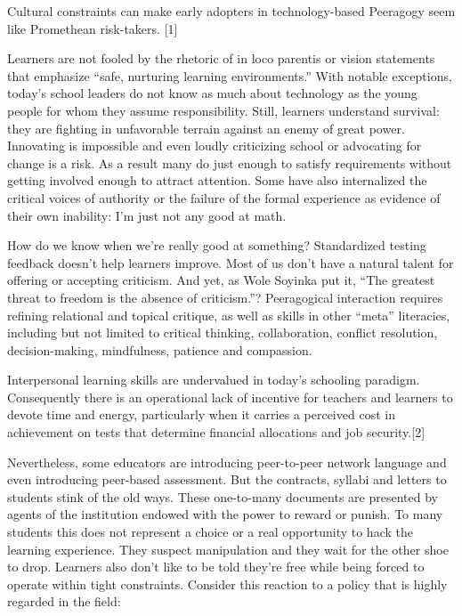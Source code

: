 Cultural constraints can make early adopters in technology-based
Peeragogy seem like Promethean risk-takers. {[}1{]}

Learners are not fooled by the rhetoric of in loco parentis or vision
statements that emphasize ``safe, nurturing learning environments.''
With notable exceptions, today's school leaders do not know as much
about technology as the young people for whom they assume
responsibility. Still, learners understand survival: they are fighting
in unfavorable terrain against an enemy of great power. Innovating is
impossible and even loudly criticizing school or advocating for change
is a risk. As a result many do just enough to satisfy requirements
without getting involved enough to attract attention. Some have also
internalized the critical voices of authority or the failure of the
formal experience as evidence of their own inability: I'm just not any
good at math.

How do we know when we're really good at something? Standardized testing
feedback doesn't help learners improve. Most of us don't have a natural
talent for offering or accepting criticism. And yet, as Wole Soyinka put
it, ``The greatest threat to freedom is the absence of criticism.''?
Peeragogical interaction requires refining relational and topical
critique, as well as skills in other ``meta'' literacies, including but
not limited to critical thinking, collaboration, conflict resolution,
decision-making, mindfulness, patience and compassion.

Interpersonal learning skills are undervalued in today's schooling
paradigm. Consequently there is an operational lack of incentive for
teachers and learners to devote time and energy, particularly when it
carries a perceived cost in achievement on tests that determine
financial allocations and job security.{[}2{]}

Nevertheless, some educators are introducing peer-to-peer network
language and even introducing peer-based assessment. But the contracts,
syllabi and letters to students stink of the old ways. These one-to-many
documents are presented by agents of the institution endowed with the
power to reward or punish. To many students this does not represent a
choice or a real opportunity to hack the learning experience. They
suspect manipulation and they wait for the other shoe to drop. Learners
also don't like to be told they're free while being forced to operate
within tight constraints. Consider this reaction to a policy that is
highly regarded in the field:

